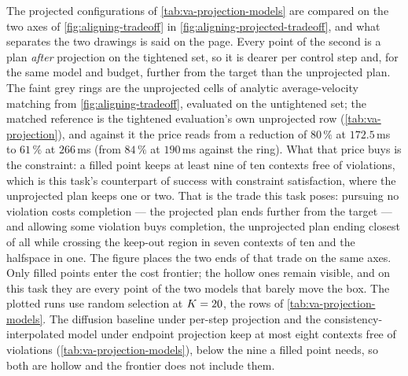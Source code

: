 The projected configurations of \autoref{tab:va-projection-models} are compared on the two axes of
\autoref{fig:aligning-tradeoff} in \autoref{fig:aligning-projected-tradeoff}, and what separates the two
drawings is said on the page. Every point of the second is a plan \emph{after} projection on the tightened
set, so it is dearer per control step and, for the same model and budget, further from the target than
the unprojected plan. The faint grey rings are the unprojected cells of analytic average-velocity matching
from \autoref{fig:aligning-tradeoff}, evaluated on the untightened set; the matched reference is the
tightened evaluation's own unprojected row (\autoref{tab:va-projection}), and against it the price reads
from a reduction of $80\,\%$ at $172.5$\,ms to $61\,\%$ at $266$\,ms (from $84\,\%$ at $190$\,ms against the
ring). What that price buys is the constraint: a filled point keeps at least nine of ten
contexts free of violations, which is this task's counterpart of success with constraint satisfaction,
where the unprojected plan keeps one or two. That is the trade this task poses: pursuing no violation
costs completion --- the projected plan ends further from the target --- and allowing some violation
buys completion, the unprojected plan ending closest of all while crossing the keep-out region in seven
contexts of ten and the halfspace in one. The figure places the two ends of that trade on the same axes. Only filled points enter the cost frontier; the hollow ones
remain visible, and on this task they are every point of the two models that barely move the box. The
plotted runs use random selection at $K=20$, the rows of \autoref{tab:va-projection-models}. The
diffusion baseline under per-step projection and the consistency-interpolated model under endpoint
projection keep at most eight contexts free of violations (\autoref{tab:va-projection-models}), below the
nine a filled point needs, so both are hollow and the frontier does not include them.


